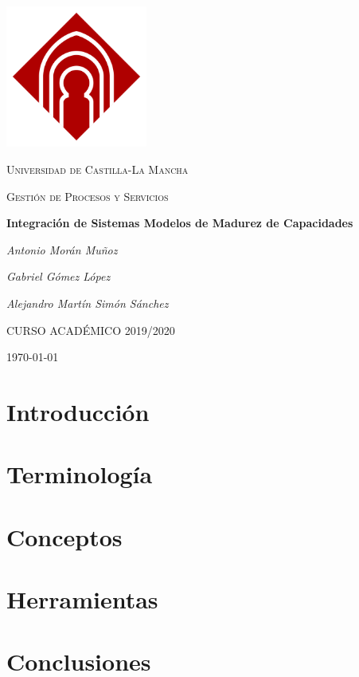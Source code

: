\documentclass[12pt,a4paper]{book}
\title{\trabajo}
\author{Antonio Morán Muñoz}
\date{Febrero 2020}
\author{Antonio Morán Muñoz}
\title{\trabajo}
\newcommand{\asignatura}{Gestión de Procesos y Servicios}
\newcommand{\trabajo}{Integración de Sistemas Modelos de Madurez de Capacidades}
\begin{document}
\begin{titlepage}
\thispagestyle{empty}
\centering
	\includegraphics[width=0.35\textwidth]{Images/castilla.png}\par\vspace{1cm}
	{\scshape\LARGE Universidad de Castilla-La Mancha \par}
	\vspace{1cm}
	{\scshape\Large \asignatura\par}
	\vspace{1.5cm}
	{\huge\bfseries \trabajo\par}
	\vspace{2cm}
	{\Large\itshape Antonio Morán Muñoz\par}
	{\Large\itshape Gabriel Gómez López\par}
	{\Large\itshape Alejandro Martín Simón Sánchez\par}

	\vfill

	{CURSO ACADÉMICO 2019/2020}
	\vfill
	{\large \today\par}
\end{titlepage}

\frontmatter
\tableofcontents

\mainmatter
\chapter{Introducción}\label{sec:introduccion}


\chapter{Terminología}\label{sec:terminologia}


\chapter{Conceptos}\label{sec:conceptos}


\chapter{Herramientas}\label{sec:herramientas}


\chapter{Conclusiones}\label{sec:conclusiones}



\newpage
\printbibliography
\end{document}
